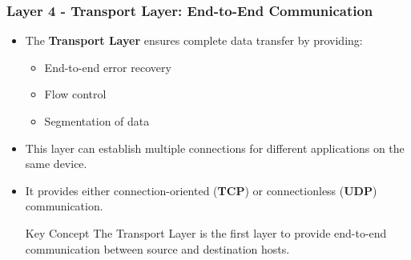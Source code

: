 \documentclass{beamer}
\begin{document}
\begin{frame}
    \frametitle{Layer 4 - Transport Layer: End-to-End Communication}
    
    \begin{itemize}
        \item The \textbf{Transport Layer} ensures complete data transfer by providing:
        \begin{itemize}
            \item End-to-end error recovery
            \item Flow control
            \item Segmentation of data
        \end{itemize}
        
        \item This layer can establish multiple connections for different applications on the same device.
        
        \item It provides either connection-oriented (\textbf{TCP}) or connectionless (\textbf{UDP}) communication.
        
        \begin{alertblock}{Key Concept}
            The Transport Layer is the first layer to provide end-to-end communication between source and destination hosts.
        \end{alertblock}
    \end{itemize}
\end{frame}
\end{document}
